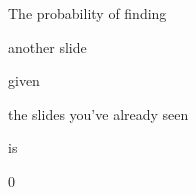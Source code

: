 \documentclass[xcolor=table]{beamer}
\begin{document}

\begin{frame}[plain]
	
	\begin{center}
		\Huge 
		The probability of finding 
		
		another slide 
		
		given 
		
		the slides you've already seen 
		
		is 
		
		0
	\end{center}
	
\end{frame}
\end{document}
